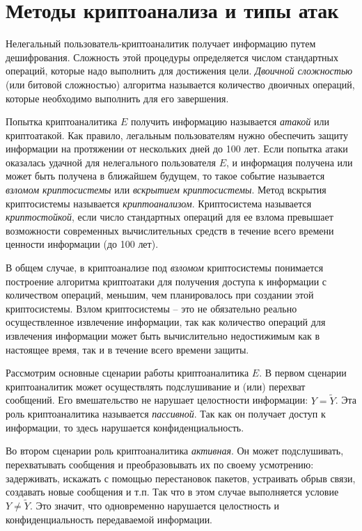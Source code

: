 \section{Методы криптоанализа и типы атак}

Нелегальный пользователь-криптоаналитик получает информацию путем дешифрования. Сложность этой процедуры определяется числом стандартных операций, которые надо выполнить для достижения цели. \emph{Двоичной сложностью} (или битовой сложностью) алгоритма называется количество двоичных операций, которые необходимо выполнить для его завершения.

Попытка криптоаналитика $E$ получить информацию называется \emph{атакой} или криптоатакой. Как правило, легальным пользователям нужно обеспечить защиту информации на протяжении от нескольких дней до 100 лет. Если попытка атаки оказалась удачной для нелегального пользователя $E$, и информация получена или может быть получена в ближайшем будущем, то такое событие называется  \emph{взломом криптосистемы} или \emph{вскрытием криптосистемы}. Метод вскрытия криптосистемы называется \emph{криптоанализом}. Криптосистема называется \emph{криптостойкой}, если число стандартных операций для ее взлома превышает возможности современных вычислительных средств в течение всего времени ценности информации (до 100 лет).

В общем случае, в криптоанализе под \emph{взломом} криптосистемы понимается построение алгоритма криптоатаки для получения доступа к информации с количеством операций, меньшим, чем планировалось при создании этой криптосистемы. Взлом криптосистемы -- это не обязательно реально осуществленное извлечение информации, так как количество операций для извлечения информации может быть вычислительно недостижимым как в настоящее время, так и в течение всего времени защиты.

Рассмотрим основные сценарии работы криптоаналитика $E$. В первом сценарии криптоаналитик может осуществлять подслушивание и (или) перехват сообщений. Его вмешательство не нарушает целостности информации: $Y=\widetilde{Y}$. Эта роль криптоаналитика называется \emph{пассивной}. Так как он получает доступ к информации, то здесь нарушается конфиденциальность.

Во втором сценарии роль криптоаналитика \emph{активная}. Он может подслушивать, перехватывать сообщения и преобразовывать их по своему усмотрению: задерживать, искажать с помощью перестановок пакетов, устраивать обрыв связи, создавать новые сообщения и т.п. Так что в этом случае выполняется условие $Y \neq \widetilde{Y}$. Это значит, что одновременно нарушается целостность и конфиденциальность передаваемой информации.

